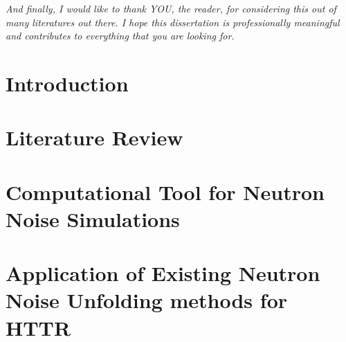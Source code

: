 \documentclass{uiucthesis2021}
\begin{document}
\begin{acknowledgments}
\textit{And finally, I would like to thank YOU, the reader, for considering this out of many literatures out there. I hope this dissertation is professionally meaningful and contributes to everything that you are looking for.}

\end{acknowledgments}

{
    \hypersetup{linkcolor=black}  %
    \tableofcontents
}

%
%
%

\mainmatter

\chapter{Introduction}


\chapter{Literature Review}


\chapter{Computational Tool for Neutron Noise Simulations}


\chapter{Application of Existing Neutron Noise Unfolding methods for HTTR}

\end{document}
